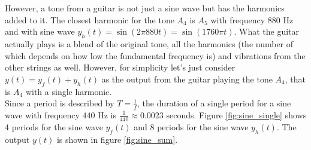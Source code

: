 However, a tone from a guitar is not just a sine wave but has the harmonics added to it. The closest harmonic for the tone $A_4$ is $A_5$ with frequency $880$ Hz and with sine wave $y_h(t) = \sin(2 \pi 880 t) = \sin(1760 \pi t)$. What the guitar actually plays is a blend of the original tone, all the harmonics (the number of which depends on how low the fundamental frequency is) and vibrations from the other strings as well. However, for simplicity let's just consider $y(t) = y_f(t) + y_h(t)$ as the output from the guitar playing the tone $A_4$, that is $A_4$ with a single harmonic. \\
Since a period is described by $T = \frac{1}{f}$, the duration of a single period for a sine wave with frequency $440$ Hz is $\frac{1}{440} \approx 0.0023$ seconds. Figure \ref{fig:sine_single} shows 4 periods for the sine wave $y_f(t)$ and 8 periods for the sine wave $y_h(t)$. The output $y(t)$ is shown in figure \ref{fig:sine_sum}. \cite{harmonics}

